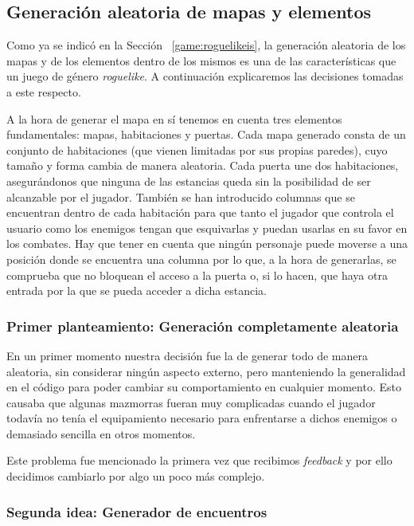 \subsection{Generación aleatoria de mapas y elementos}

Como ya se indicó en la Sección ~\ref{game:roguelikeis}, la generación aleatoria de los mapas y de los elementos dentro de los mismos es una de las características que un juego de género \textit{roguelike}. A continuación explicaremos las decisiones tomadas a este respecto.

A la hora de generar el mapa en sí tenemos en cuenta tres elementos fundamentales: mapas, habitaciones y puertas. Cada mapa generado consta de un conjunto de habitaciones (que vienen limitadas por sus propias paredes), cuyo tamaño y forma cambia de manera aleatoria. Cada puerta une dos habitaciones, asegurándonos que ninguna de las estancias queda sin la posibilidad de ser alcanzable por el jugador. También se han introducido columnas que se encuentran dentro de cada habitación para que tanto el jugador que controla el usuario como los enemigos tengan que esquivarlas y puedan usarlas en su favor en los combates. Hay que tener en cuenta que ningún personaje puede moverse a una posición donde se encuentra una columna por lo que, a la hora de generarlas, se comprueba que no bloquean el acceso a la puerta o, si lo hacen, que haya otra entrada por la que se pueda acceder a dicha estancia.

\subsubsection{Primer planteamiento: Generación completamente aleatoria}

En un primer momento nuestra decisión fue la de generar todo de manera aleatoria, sin considerar ningún aspecto externo, pero manteniendo la generalidad en el código para poder cambiar su comportamiento en cualquier momento. Esto causaba que algunas mazmorras fueran muy complicadas cuando el jugador todavía no tenía el equipamiento necesario para enfrentarse a dichos enemigos o demasiado sencilla en otros momentos.

Este problema fue mencionado la primera vez que recibimos \textit{feedback} y por ello decidimos cambiarlo por algo un poco más complejo.

\subsubsection{Segunda idea: Generador de encuentros}
\label{generadorencuentros}

